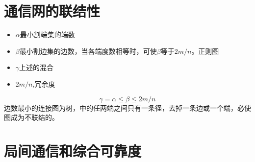 \section{通信网的联结性
}
\begin{itemize}
	\item $ \alpha $最小割端集的端数
	\item $ \beta $最小割边集的边数，当各端度数相等时，可使$ \beta $等于$ 2m/n $。正则图
	\item $ \gamma $上述的混合
	\item $ 2m/n $,冗余度
\end{itemize}
\begin{equation}\label{key}
\gamma = \alpha \le \beta \le 2m/n
\end{equation}
边数最小的连接图为树，中的任两端之间只有一条径，去掉一条边或一个端，必使图成为不联结的。

\section{局间通信和综合可靠度
}


